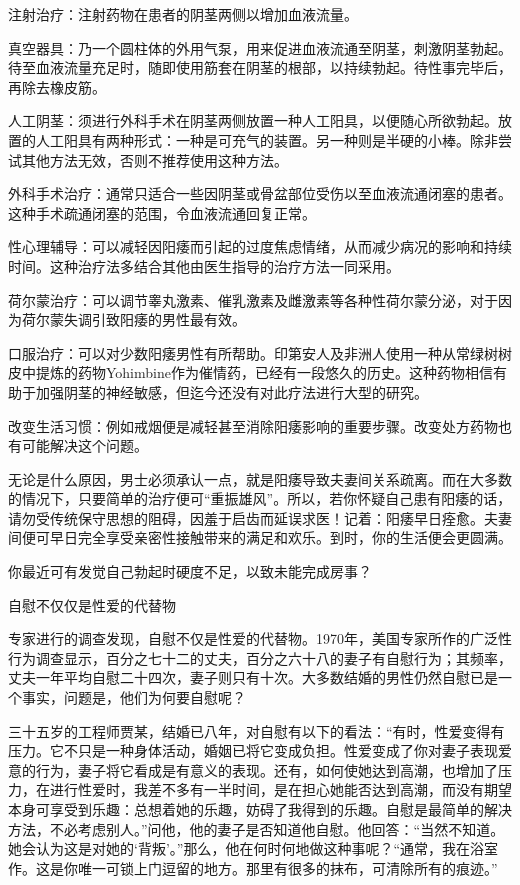 \documentclass[12pt,UTF8,openany]{ctexbook}
\begin{document}
注射治疗：注射药物在患者的阴茎两侧以增加血液流量。

真空器具：乃一个圆柱体的外用气泵，用来促进血液流通至阴茎，刺激阴茎勃起。待至血液流量充足时，随即使用筋套在阴茎的根部，以持续勃起。待性事完毕后，再除去橡皮筋。

人工阴茎：须进行外科手术在阴茎两侧放置一种人工阳具，以便随心所欲勃起。放置的人工阳具有两种形式：一种是可充气的装置。另一种则是半硬的小棒。除非尝试其他方法无效，否则不推荐使用这种方法。

外科手术治疗：通常只适合一些因阴茎或骨盆部位受伤以至血液流通闭塞的患者。这种手术疏通闭塞的范围，令血液流通回复正常。

性心理辅导：可以减轻因阳痿而引起的过度焦虑情绪，从而减少病况的影响和持续时间。这种治疗法多结合其他由医生指导的治疗方法一同采用。

荷尔蒙治疗：可以调节睾丸激素、催乳激素及雌激素等各种性荷尔蒙分泌，对于因为荷尔蒙失调引致阳痿的男性最有效。

口服治疗：可以对少数阳痿男性有所帮助。印第安人及非洲人使用一种从常绿树树皮中提炼的药物Yohimbine作为催情药，已经有一段悠久的历史。这种药物相信有助于加强阴茎的神经敏感，但迄今还没有对此疗法进行大型的研究。

改变生活习惯：例如戒烟便是减轻甚至消除阳痿影响的重要步骤。改变处方药物也有可能解决这个问题。

无论是什么原因，男士必须承认一点，就是阳痿导致夫妻间关系疏离。而在大多数的情况下，只要简单的治疗便可“重振雄风”。所以，若你怀疑自己患有阳痿的话，请勿受传统保守思想的阻碍，因羞于启齿而延误求医！记着：阳痿早日痊愈。夫妻间便可早日完全享受亲密性接触带来的满足和欢乐。到时，你的生活便会更圆满。

你最近可有发觉自己勃起时硬度不足，以致未能完成房事？





自慰不仅仅是性爱的代替物


专家进行的调查发现，自慰不仅是性爱的代替物。1970年，美国专家所作的广泛性行为调查显示，百分之七十二的丈夫，百分之六十八的妻子有自慰行为；其频率，丈夫一年平均自慰二十四次，妻子则只有十次。大多数结婚的男性仍然自慰已是一个事实，问题是，他们为何要自慰呢？

三十五岁的工程师贾某，结婚已八年，对自慰有以下的看法：“有时，性爱变得有压力。它不只是一种身体活动，婚姻已将它变成负担。性爱变成了你对妻子表现爱意的行为，妻子将它看成是有意义的表现。还有，如何使她达到高潮，也增加了压力，在进行性爱时，我差不多有一半时间，是在担心她能否达到高潮，而没有期望本身可享受到乐趣：总想着她的乐趣，妨碍了我得到的乐趣。自慰是最简单的解决方法，不必考虑别人。”问他，他的妻子是否知道他自慰。他回答：“当然不知道。她会认为这是对她的‘背叛’。”那么，他在何时何地做这种事呢？“通常，我在浴室作。这是你唯一可锁上门逗留的地方。那里有很多的抹布，可清除所有的痕迹。”
\end{document}
